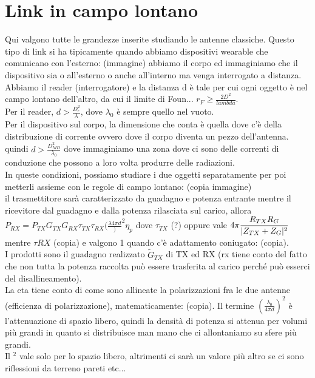 \documentclass[oneside, 12pt]{extbook}
\DeclarePairedDelimiter{\abs}{\lvert}{\rvert}
\begin{document}
\section{Link in campo lontano}
Qui valgono tutte le grandezze inserite studiando le antenne classiche. Questo tipo di link si ha tipicamente quando abbiamo dispositivi wearable che comunicano con l'esterno: (immagine) abbiamo il corpo ed immaginiamo che il dispositivo sia o all'esterno o anche all'interno ma venga interrogato a distanza.\\Abbiamo il reader (interrogatore) e la distanza d è tale per cui ogni oggetto è nel campo lontano dell'altro, da cui il limite di Foun... $r_F \geq \frac{2D^2}{lambda}$.\\Per il reader, $d > \frac{D_r^2}{\lambda}$, dove $\lambda_0$ è sempre quello nel vuoto.\\Per il dispositivo sul corpo, la dimensione che conta è quella dove c'è della distribuzione di corrente ovvero dove il corpo diventa un pezzo dell'antenna. quindi $d > \frac{D_{MD}^2}{\lambda_0}$ dove immaginiamo una zona dove ci sono delle correnti di conduzione che possono a loro volta produrre delle radiazioni.\\In queste condizioni, possiamo studiare i due oggetti separatamente per poi metterli assieme con le regole di campo lontano: (copia immagine)\\
il trasmettitore sarà caratterizzato da guadagno e potenza entrante mentre il ricevitore dal guadagno e dalla potenza rilasciata sul carico, allora $P_{RX} = P_{TX} G_{TX} G_{RX} \tau_{TX} \tau_{RX} (\frac{\lambda4\pi d})^2 \eta_p$
dove $\tau_{TX}$ (?) oppure vale $4\pi \dfrac{R_{TX} R_G}{\abs{Z_{TX} + Z_G}^2}$
mentre $\tau{RX}$ (copia) e valgono 1 quando c'è adattamento coniugato: (copia).\\I prodotti sono il guadagno realizzato $\tilde{G}_{TX}$ di TX ed RX (rx tiene conto del fatto che non tutta la potenza raccolta può essere trasferita al carico perché può esserci del disallineamento).\\ La eta tiene conto di come sono allineate la polarizzazioni fra le due antenne (efficienza di polarizzazione), matematicamente: (copia). Il termine $(\frac{\lambda_0}{4 \pi d})^2$ è l'attenuazione di spazio libero, quindi la densità di potenza si attenua per volumi più grandi in quanto si distribuisce man mano che ci allontaniamo su sfere più grandi.\\Il $^2$ vale solo per lo spazio libero, altrimenti ci sarà un valore più altro se ci sono riflessioni da terreno pareti etc...
\end{document}
